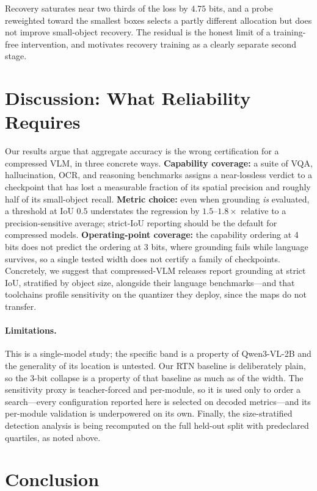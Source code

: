 \documentclass[letterpaper]{article} %
\begin{document}
Recovery saturates near two thirds of the loss by $4.75$ bits, and a probe reweighted toward the smallest boxes selects a partly different allocation but does not improve small-object recovery. The residual is the honest limit of a training-free intervention, and motivates recovery training as a clearly separate second stage.

\section{Discussion: What Reliability Requires}

Our results argue that aggregate accuracy is the wrong certification for a compressed VLM, in three concrete ways. \textbf{Capability coverage:} a suite of VQA, hallucination, OCR, and reasoning benchmarks assigns a near-lossless verdict to a checkpoint that has lost a measurable fraction of its spatial precision and roughly half of its small-object recall. \textbf{Metric choice:} even when grounding \emph{is} evaluated, a threshold at IoU $0.5$ understates the regression by $1.5$--$1.8\times$ relative to a precision-sensitive average; strict-IoU reporting should be the default for compressed models. \textbf{Operating-point coverage:} the capability ordering at 4 bits does not predict the ordering at 3 bits, where grounding fails while language survives, so a single tested width does not certify a family of checkpoints. Concretely, we suggest that compressed-VLM releases report grounding at strict IoU, stratified by object size, alongside their language benchmarks---and that toolchains profile sensitivity on the quantizer they deploy, since the maps do not transfer.

\paragraph{Limitations.} This is a single-model study; the specific band is a property of Qwen3-VL-2B and the generality of its location is untested. Our RTN baseline is deliberately plain, so the 3-bit collapse is a property of that baseline as much as of the width. The sensitivity proxy is teacher-forced and per-module, so it is used only to order a search---every configuration reported here is selected on decoded metrics---and its per-module validation is underpowered on its own. Finally, the size-stratified detection analysis is being recomputed on the full held-out split with predeclared quartiles, as noted above.

\section{Conclusion}
\end{document}
